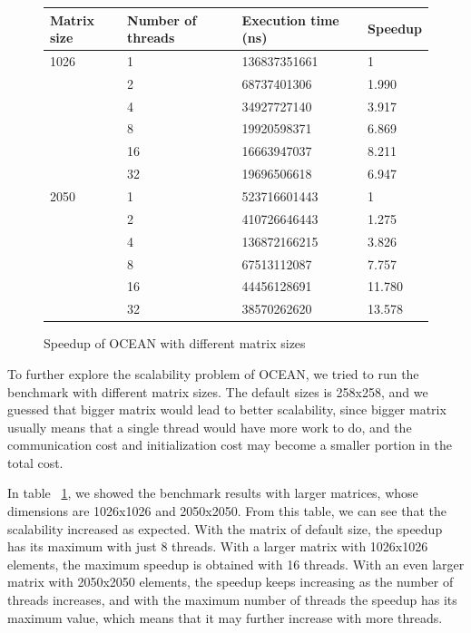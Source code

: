 \begin{figure}[here]
	\center
	\begin{tabular}{ l | l | l | l}
	Matrix size &	Number of threads &  Execution time (ns) & Speedup \\
	\hline
	1026 &	1	&	136837351661	&	1\\
	&	2	&	68737401306	&	1.990\\
	&	4	&	34927727140	&	3.917\\
	&	8	&	19920598371	&	6.869\\
	&	16	&	16663947037	&	8.211\\
	&	32	&	19696506618	&	6.947\\
	\hline
	2050 & 	1	&	523716601443	&	1\\
	&	2	&	410726646443	&	1.275\\
	&	4	&	136872166215	&	3.826\\
	&	8	&	67513112087	&	7.757\\
	&	16	&	44456128691	&	11.780\\
	&	32	&	38570262620	&	13.578\\
\end{tabular}
\caption{Speedup of OCEAN with different matrix sizes}
\label{fig:ocean_matrix}
\end{figure}

To further explore the scalability problem of OCEAN, we tried to run the 
benchmark with different matrix sizes. The default sizes is 258x258, and we
guessed that bigger matrix would lead to better scalability, since bigger
matrix usually means that a single thread would have more work to do, and the
communication cost and initialization cost may become a smaller portion in
the total cost. 

In table ~\ref{fig:ocean_matrix}, we showed the benchmark
results with larger matrices, whose dimensions are 1026x1026 and 2050x2050.
From this table, we can see that the scalability increased as expected.
With the matrix of default size, the speedup has its maximum with just 
8 threads.  With a larger matrix with 1026x1026 elements, the maximum speedup
is obtained with 16 threads. With an even larger matrix with 2050x2050
elements, the speedup keeps increasing as the number of threads increases,
and with the maximum number of threads the speedup has its maximum value,
which means that it may further increase with more threads.
